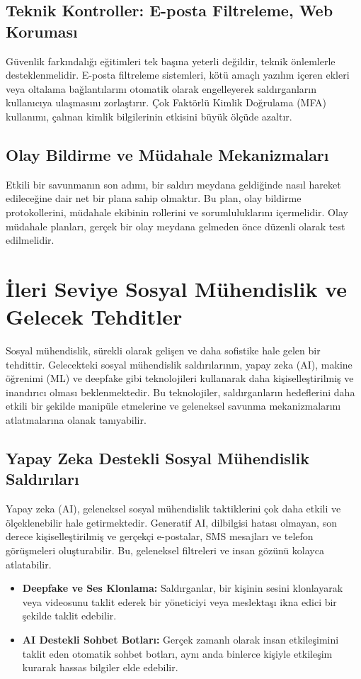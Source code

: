\subsection{Teknik Kontroller: E-posta Filtreleme, Web Koruması}

Güvenlik farkındalığı eğitimleri tek başına yeterli değildir, teknik önlemlerle desteklenmelidir. E-posta filtreleme sistemleri, kötü amaçlı yazılım içeren ekleri veya oltalama bağlantılarını otomatik olarak engelleyerek saldırganların kullanıcıya ulaşmasını zorlaştırır. Çok Faktörlü Kimlik Doğrulama (MFA) kullanımı, çalınan kimlik bilgilerinin etkisini büyük ölçüde azaltır.

\subsection{Olay Bildirme ve Müdahale Mekanizmaları}

Etkili bir savunmanın son adımı, bir saldırı meydana geldiğinde nasıl hareket edileceğine dair net bir plana sahip olmaktır. Bu plan, olay bildirme protokollerini, müdahale ekibinin rollerini ve sorumluluklarını içermelidir. Olay müdahale planları, gerçek bir olay meydana gelmeden önce düzenli olarak test edilmelidir.

\section{İleri Seviye Sosyal Mühendislik ve Gelecek Tehditler}

Sosyal mühendislik, sürekli olarak gelişen ve daha sofistike hale gelen bir tehdittir. Gelecekteki sosyal mühendislik saldırılarının, yapay zeka (AI), makine öğrenimi (ML) ve deepfake gibi teknolojileri kullanarak daha kişiselleştirilmiş ve inandırıcı olması beklenmektedir. Bu teknolojiler, saldırganların hedeflerini daha etkili bir şekilde manipüle etmelerine ve geleneksel savunma mekanizmalarını atlatmalarına olanak tanıyabilir.

\subsection{Yapay Zeka Destekli Sosyal Mühendislik Saldırıları}

Yapay zeka (AI), geleneksel sosyal mühendislik taktiklerini çok daha etkili ve ölçeklenebilir hale getirmektedir. Generatif AI, dilbilgisi hatası olmayan, son derece kişiselleştirilmiş ve gerçekçi e-postalar, SMS mesajları ve telefon görüşmeleri oluşturabilir. Bu, geleneksel filtreleri ve insan gözünü kolayca atlatabilir.
\begin{itemize}
    \item \textbf{Deepfake ve Ses Klonlama:} Saldırganlar, bir kişinin sesini klonlayarak veya videosunu taklit ederek bir yöneticiyi veya meslektaşı ikna edici bir şekilde taklit edebilir.
    \item \textbf{AI Destekli Sohbet Botları:} Gerçek zamanlı olarak insan etkileşimini taklit eden otomatik sohbet botları, aynı anda binlerce kişiyle etkileşim kurarak hassas bilgiler elde edebilir.
\end{itemize}

